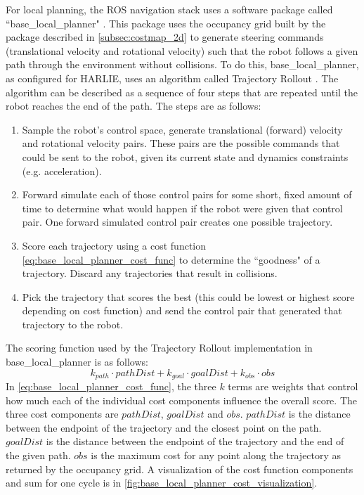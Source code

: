 For local planning, the ROS navigation stack uses a software package called ``base\_lo\-cal\_planner" \autocite{BaseLocalPlannerWiki}. This package uses the occupancy grid built by the package described in \autoref{subsec:costmap_2d} to generate steering commands (translational velocity and rotational velocity) such that the robot follows a given path through the environment without collisions. To do this, base\_local\_planner, as configured for HARLIE, uses an algorithm called Trajectory Rollout \autocite{Gerkey_Konolige_2008}. The algorithm can be described as a sequence of four steps that are repeated until the robot reaches the end of the path. The steps are as follows:
\begin{enumerate}
\item Sample the robot's control space, generate translational (forward) velocity and rotational velocity pairs. These pairs are the possible commands that could be sent to the robot, given its current state and dynamics constraints (e.g. acceleration).
\item Forward simulate each of those control pairs for some short, fixed amount of time to determine what would happen if the robot were given that control pair. One forward simulated control pair creates one possible trajectory.
\item Score each trajectory using a cost function \eqref{eq:base_local_planner_cost_func} to determine the ``goodness" of a trajectory. Discard any trajectories that result in collisions.
\item Pick the trajectory that scores the best (this could be lowest or highest score depending on cost function) and send the control pair that generated that trajectory to the robot.
\end{enumerate}

The scoring function used by the Trajectory Rollout implementation in base\_lo\-cal\_planner is as follows:
\begin{equation}
	k_{path} \cdot pathDist + k_{goal} \cdot goalDist + k_{obs} \cdot obs \label{eq:base_local_planner_cost_func}
\end{equation}
In \eqref{eq:base_local_planner_cost_func}, the three $k$ terms are weights that control how much each of the individual cost components influence the overall score. The three cost components are $pathDist$, $goalDist$ and $obs$. $pathDist$ is the distance between the endpoint of the trajectory and the closest point on the path. $goalDist$ is the distance between the endpoint of the trajectory and the end of the given path. $obs$ is the maximum cost for any point along the trajectory as returned by the occupancy grid. A visualization of the cost function components and sum for one cycle is in \autoref{fig:base_local_planner_cost_visualization}.

